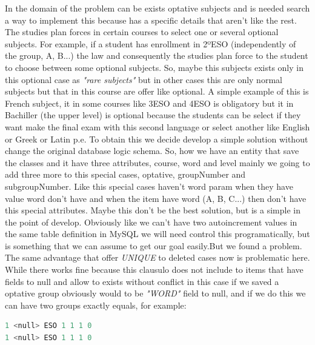In the domain of the problem can be exists optative subjects and is
needed search a way to implement this because has a specific details
that aren't like the rest.
\intro
The studies plan forces in certain courses to select one or several
optional subjects. For example, if a student has enrollment in 2ºESO
(independently of the group, A, B...) the law and consequently the
studies plan force to the student to choose between some optional
subjects. So, maybe this subjects exists only in this optional case
as \textit{"rare subjects"} but in other cases this are only normal subjects
but that in this course are offer like optional.
\intro
A simple example of this is French subject, it in some courses like
3ESO and 4ESO is obligatory but it in Bachiller (the upper level)
is optional because the students can be select if they want make the
final exam with this second language or select another like English
or Greek or Latin p.e.
\intro
To obtain this we decide develop a simple solution without change
the original database logic schema. So, how we have an entity that
save the classes and it have three attributes, course, word and level
mainly we going to add three more to this special cases, optative,
groupNumber and subgroupNumber. Like this special cases haven't word
param when they have value word don't have and when the item have
word (A, B, C...) then don't have this special attributes.
\intro
Maybe this don't be the best solution, but is a simple in the point
of develop.
Obviously like we can't have two autoincrement values in the same
table definition in MySQL we will need control this programatically,
but is something that we can assume to get our goal easily.But we found a problem.
\intro
The same advantage that offer \textit{UNIQUE} to deleted cases now is problematic
here. While there works fine because this clausulo does not include to items that
have fields to null and allow to exists without conflict in this case if we saved
a optative group obviously would to be \textit{"WORD"} field to null, and if we
do this we can have two groups exactly equals, for example:

\begin{lstlisting}[language=python,frame=none]
1 <null> ESO 1 1 1 0
1 <null> ESO 1 1 1 0
\end{lstlisting}

